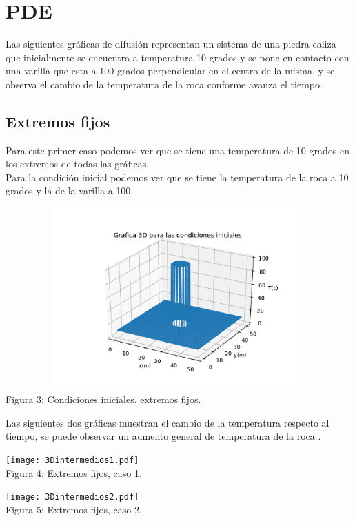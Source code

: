 \documentclass{article}
\begin{document}
\section{PDE}
Las siguientes gráficas de difusión representan un sistema de una piedra caliza que inicialmente se encuentra a temperatura 10 grados y se pone en contacto con una varilla que esta a 100 grados perpendicular en el centro de la misma, y se observa el cambio de la temperatura de la roca conforme avanza el tiempo. 

\subsection{Extremos fijos}
Para este primer caso podemos ver que se tiene una temperatura de 10 grados en los extremos de todas las gráficas.\\
Para la condición inicial podemos ver que se tiene la temperatura de la roca a 10 grados y la de la varilla a 100.
\begin{center}
\includegraphics[width=13cm, height=7cm]{3DCondIni.pdf}\\
\small{Figura 3: Condiciones iniciales, extremos fijos.}
\end{center}

Las siguientes dos gráficas muestran el cambio de la temperatura respecto al tiempo, se puede observar un aumento general de temperatura de la roca . 
\begin{center}
\texttt{[image: 3Dintermedios1.pdf]}\\
\small{Figura 4: Extremos fijos, caso 1.}
\end{center}

\begin{center}
\texttt{[image: 3Dintermedios2.pdf]}\\
\small{Figura 5: Extremos fijos, caso 2.}
\end{center}
\end{document}
